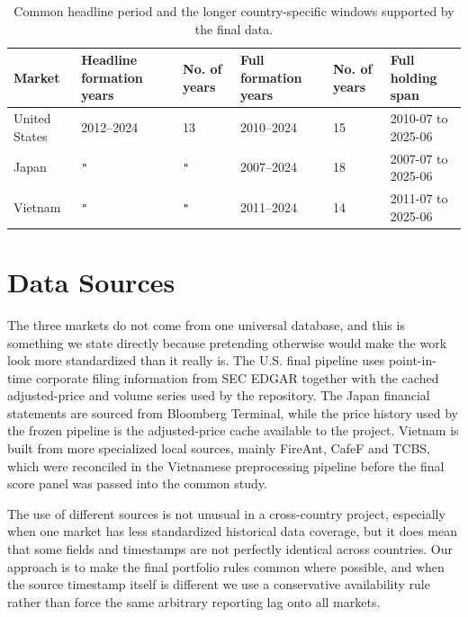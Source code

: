 \documentclass[11pt,a4paper]{report}
\numberwithin{figure}{chapter}
\numberwithin{table}{chapter}
\numberwithin{equation}{chapter}
\begin{document}
\begin{table}[H]
\centering
\scriptsize
\caption{Common headline period and the longer country-specific windows supported by the final data.}
\label{tab:sample_windows}

\begin{tabularx}{\textwidth}{
M{0.18\textwidth}
M{0.18\textwidth}
M{0.11\textwidth}
M{0.18\textwidth}
M{0.11\textwidth}
Y}
\hline
\textbf{Market} &
\textbf{Headline formation years} &
\textbf{No. of years} &
\textbf{Full formation years} &
\textbf{No. of years} &
\textbf{Full holding span} \\
\hline
United States & 2012--2024 & 13 & 2010--2024 & 15 & 2010-07 to 2025-06 \\
Japan & \texttt{"} & \texttt{"} & 2007--2024 & 18 & 2007-07 to 2025-06 \\
Vietnam & \texttt{"} & \texttt{"} & 2011--2024 & 14 & 2011-07 to 2025-06 \\
\hline
\end{tabularx}
\end{table}

\section{Data Sources}
\label{sec:data_sources}

The three markets do not come from one universal database, and this is something we state directly because pretending otherwise would make the work look more standardized than it really is. The U.S. final pipeline uses point-in-time corporate filing information from SEC EDGAR together with the cached adjusted-price and volume series used by the repository. The Japan financial statements are sourced from Bloomberg Terminal, while the price history used by the frozen pipeline is the adjusted-price cache available to the project. Vietnam is built from more specialized local sources, mainly FireAnt, CafeF and TCBS, which were reconciled in the Vietnamese preprocessing pipeline before the final score panel was passed into the common study.

The use of different sources is not unusual in a cross-country project, especially when one market has less standardized historical data coverage, but it does mean that some fields and timestamps are not perfectly identical across countries. Our approach is to make the final portfolio rules common where possible, and when the source timestamp itself is different we use a conservative availability rule rather than force the same arbitrary reporting lag onto all markets.
\end{document}
